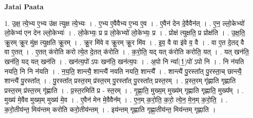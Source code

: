 \documentclass[17pt]{extarticle}
\begin{document}
\textbf{Jatai Paata} \newline

1. उ॒क्ष॒ त्ये॒भ्य ए॒भ्य उ॑क्ष त्युक्ष त्ये॒भ्यः । . ए॒भ्य ए॒वैवैभ्य ए॒भ्य ए॒व । . ए॒वैन॑ देन दे॒वैवैन॑त् । . ए॒न॒ ल्लो॒केभ्यो॑ लो॒केभ्य॑ एन देन ल्लो॒केभ्यः॑ । . लो॒केभ्यः॒ प्र प्र लो॒केभ्यो॑ लो॒केभ्यः॒ प्र । . प्रोक्ष॑ त्युक्षति॒ प्र प्रोक्ष॑ति । . उ॒क्ष॒ति॒ क्रू॒रम् क्रू॒र मु॑क्ष त्युक्षति क्रू॒रम् । . क्रू॒र मि॑वे व क्रू॒रम् क्रू॒र मि॑व । . इ॒व॒ वै वा इ॑वे व॒ वै । . वा ए॒त दे॒तद् वै वा ए॒तत् । . ए॒तत् क॑रोति करो त्ये॒त दे॒तत् क॑रोति । . क॒रो॒ति॒ यद् यत् क॑रोति करोति॒ यत् । . यत् खन॑ति॒ खन॑ति॒ यद् यत् खन॑ति । . खन॑त्य॒पो॑ ऽपः खन॑ति॒ खन॑त्य॒पः । . अ॒पो नि न्या᳚(1॒)पो॑ ऽपो नि । . नि न॑यति नयति॒ नि नि न॑यति । . न॒य॒ति॒ शान्त्यै॒ शान्त्यै॑ नयति नयति॒ शान्त्यै᳚ । . शान्त्यै॑ पु॒रस्ता᳚त् पु॒रस्ता॒च् छान्त्यै॒ शान्त्यै॑ पु॒रस्ता᳚त् । . पु॒रस्ता᳚त् प्रस्त॒रम् प्र॑स्त॒रम् पु॒रस्ता᳚त् पु॒रस्ता᳚त् प्रस्त॒रम् । . प्र॒स्त॒रम् गृ॑ह्णाति गृह्णाति प्रस्त॒रम् प्र॑स्त॒रम् गृ॑ह्णाति । . प्र॒स्त॒रमिति॑ प्र - स्त॒रम् । . गृ॒ह्णा॒ति॒ मुख्य॒म् मुख्य॑म् गृह्णाति गृह्णाति॒ मुख्य᳚म् । . मुख्य॑ मे॒वैव मुख्य॒म् मुख्य॑ मे॒व । . ए॒वैन॑ मेन मे॒वैवैन᳚म् । . ए॒न॒म् क॒रो॒ति॒ क॒रो॒ त्ये॒न॒ मे॒न॒म् क॒रो॒ति॒ । . क॒रो॒तीय॑न्त॒ मिय॑न्तम् करोति करो॒तीय॑न्तम् । . इय॑न्तम् गृह्णाति गृह्णा॒तीय॑न्त॒ मिय॑न्तम् गृह्णाति । \newline
\end{document}
